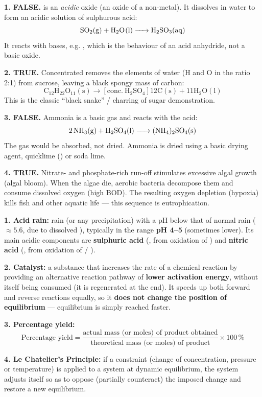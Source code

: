 \documentclass[11pt]{article}
\begin{document}
\begin{corrige}
\textbf{1. FALSE.}  is an \emph{acidic} oxide (an oxide of a non-metal). It dissolves in water to form an acidic solution of sulphurous acid:
\[ \ce{SO2(g) + H2O(l) -> H2SO3(aq)} \]
It reacts with bases, e.g. , which is the behaviour of an acid anhydride, not a basic oxide.

\textbf{2. TRUE.} Concentrated  removes the elements of water (H and O in the ratio 2:1) from sucrose, leaving a black spongy mass of carbon:
\[ \ensuremath{\mathrm{C_{12}H_{22}O_{11}(s) \rightarrow [conc.\ H_{2}SO_{4}] 12C(s) + 11H_{2}O(l)}} \]
This is the classic ``black snake'' / charring of sugar demonstration.

\textbf{3. FALSE.} Ammonia is a basic gas and reacts with the acid:
\[ \ce{2NH3(g) + H2SO4(l) -> (NH4)2SO4(s)} \]
The gas would be absorbed, not dried. Ammonia is dried using a basic drying agent, quicklime () or soda lime.

\textbf{4. TRUE.} Nitrate- and phosphate-rich run-off stimulates excessive algal growth (algal bloom). When the algae die, aerobic bacteria decompose them and consume dissolved oxygen (high BOD). The resulting oxygen depletion (hypoxia) kills fish and other aquatic life --- this sequence is eutrophication.
\end{corrige}

\begin{corrige}
\textbf{1. Acid rain:} rain (or any precipitation) with a pH below that of normal rain ($\approx 5.6$, due to dissolved ), typically in the range \textbf{pH 4--5} (sometimes lower). Its main acidic components are \textbf{sulphuric acid} (, from oxidation of ) and \textbf{nitric acid} (, from oxidation of  / ).

\textbf{2. Catalyst:} a substance that increases the rate of a chemical reaction by providing an alternative reaction pathway of \textbf{lower activation energy}, without itself being consumed (it is regenerated at the end). It speeds up both forward and reverse reactions equally, so it \textbf{does not change the position of equilibrium} --- equilibrium is simply reached faster.

\textbf{3. Percentage yield:}
\[ \text{Percentage yield} = \frac{\text{actual mass (or moles) of product obtained}}{\text{theoretical mass (or moles) of product}} \times 100\,\% \]

\textbf{4. Le Chatelier's Principle:} if a constraint (change of concentration, pressure or temperature) is applied to a system at dynamic equilibrium, the system adjusts itself so as to oppose (partially counteract) the imposed change and restore a new equilibrium.
\end{corrige}
\end{document}
